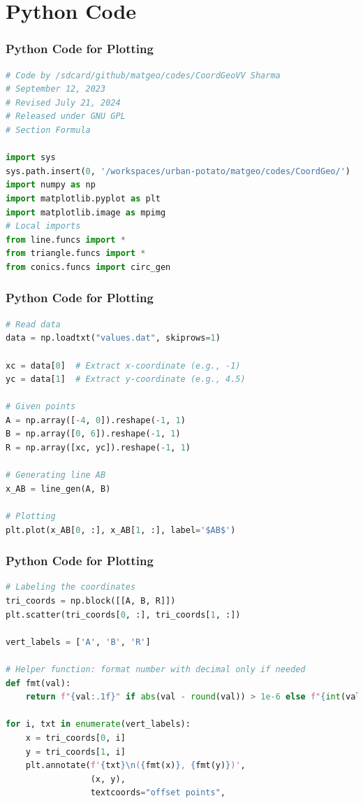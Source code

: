 \documentclass{beamer}
\theoremstyle{remark}
\numberwithin{equation}{section}
\begin{document}
\section{Python Code}
\begin{frame}[fragile]
\frametitle{Python Code for Plotting}
\begin{lstlisting}[language=Python]
# Code by /sdcard/github/matgeo/codes/CoordGeoVV Sharma
# September 12, 2023
# Revised July 21, 2024
# Released under GNU GPL
# Section Formula

import sys
sys.path.insert(0, '/workspaces/urban-potato/matgeo/codes/CoordGeo/')  # path to my scripts
import numpy as np
import matplotlib.pyplot as plt
import matplotlib.image as mpimg
# Local imports
from line.funcs import *
from triangle.funcs import *
from conics.funcs import circ_gen

\end{lstlisting}
\end{frame}

\begin{frame}[fragile]
\frametitle{Python Code for Plotting}
\begin{lstlisting}[language=Python]
# Read data
data = np.loadtxt("values.dat", skiprows=1)

xc = data[0]  # Extract x-coordinate (e.g., -1)
yc = data[1]  # Extract y-coordinate (e.g., 4.5)

# Given points
A = np.array([-4, 0]).reshape(-1, 1)
B = np.array([0, 6]).reshape(-1, 1)
R = np.array([xc, yc]).reshape(-1, 1)

# Generating line AB
x_AB = line_gen(A, B)

# Plotting
plt.plot(x_AB[0, :], x_AB[1, :], label='$AB$')


\end{lstlisting}
\end{frame}

\begin{frame}[fragile]
\frametitle{Python Code for Plotting}
\begin{lstlisting}[language=Python]
# Labeling the coordinates
tri_coords = np.block([[A, B, R]])
plt.scatter(tri_coords[0, :], tri_coords[1, :])

vert_labels = ['A', 'B', 'R']

# Helper function: format number with decimal only if needed
def fmt(val):
    return f"{val:.1f}" if abs(val - round(val)) > 1e-6 else f"{int(val)}"

for i, txt in enumerate(vert_labels):
    x = tri_coords[0, i]
    y = tri_coords[1, i]
    plt.annotate(f'{txt}\n({fmt(x)}, {fmt(y)})',
                 (x, y),
                 textcoords="offset points",

\end{lstlisting}
\end{frame}
\end{document}
